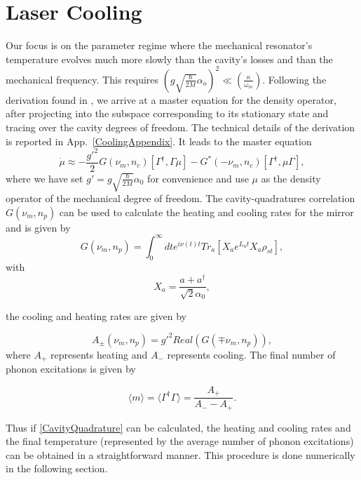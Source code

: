 \documentclass[reprint, amsmath,amssymb, aps,pra]{revtex4-1}
\begin{document}
\section{Laser Cooling}\label{LasCool}

Our focus is on the parameter regime where the mechanical resonator's
temperature evolves much more slowly than the cavity's losses and than
the mechanical frequency. This requires
$(g\sqrt{\frac{\hbar}{2M}}\alpha_o)^2 \ll (\frac{\kappa}{\omega_m})$. Following the
derivation found in \cite{LCNooshi}, we arrive at a master equation
for the density operator, after projecting into the subspace corresponding to
its stationary state and tracing over the cavity degrees of freedom. The technical details of the derivation is reported in App.~\ref{CoolingAppendix}. It leads to the master equation 
\begin{equation}\label{eq:projected_master_equation}
\dot{\mu}\approx -\frac{g'^2}{2}G(\nu_m,n_c)[\Gamma^\dagger,\Gamma\mu]-G^*(-\nu_m,n_c)[\Gamma^\dagger,\mu\Gamma],
\end{equation} where we have set $g'=g\sqrt{\frac{\hbar}{2M}}\alpha_0$  for convenience and use $\mu$ as the density operator of the mechanical degree of freedom. The
cavity-quadratures correlation $G(\nu_m,n_p)$ can be used to calculate the heating and cooling rates
for the mirror and is given by
\begin{equation} \label{CavityQuadrature}
G(\nu_m,n_p) = \int_0^\infty dt e^{i\nu(t) t}Tr_a[X_a e^{L_a t} X_a \rho_{st}],
\end{equation} with 
\begin{equation}
X_a = \frac{a + a^\dagger}{\sqrt{2}\alpha_0},
\end{equation}

the cooling and heating rates are given by


\begin{equation}
A_\pm(\nu_m,n_p) = g'^2Real(G(\mp \nu_m,n_p)),
\end{equation} where $A_+$ represents heating and $A_-$ represents cooling. The final number of phonon excitations is given by

\begin{equation}
\langle m \rangle =\langle \Gamma^\dagger \Gamma \rangle = \frac{A_+}{A_- - A_+}.
\end{equation}

Thus if \eqref{CavityQuadrature} can be calculated, the heating and
cooling rates and the final temperature (represented by the
average number of phonon excitations) can be obtained in a
straightforward manner. This procedure is done numerically in the
following section.
\end{document}
